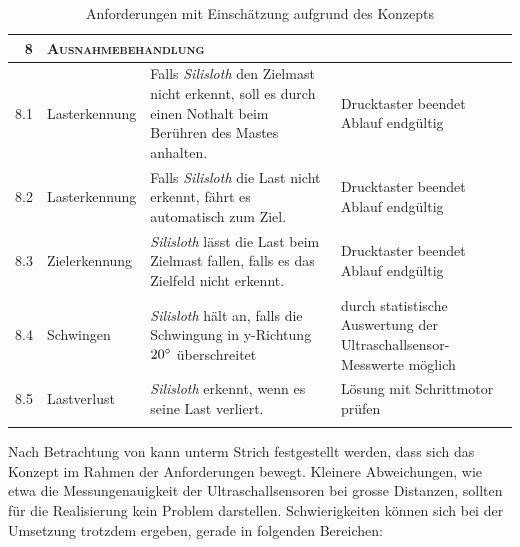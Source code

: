 {\begin{longtable}{|r|p{2cm}|p{5cm}|p{5.5cm}|}
    \hline
    \textsc{8} & \multicolumn{3}{l|}{\textsc{Ausnahmebehandlung}} \\
    \hline
    8.1 & Lasterkennung & Falls \textit{Silisloth} den Zielmast nicht erkennt, soll es durch einen Nothalt beim Berühren des Mastes anhalten. & Drucktaster beendet Ablauf endgültig \\
8.2 & Lasterkennung & Falls \textit{Silisloth} die Last nicht erkennt, fährt es automatisch zum Ziel. & Drucktaster beendet Ablauf endgültig \\
8.3 & Zielerkennung & \textit{Silisloth} lässt die Last beim Zielmast fallen, falls es das Zielfeld nicht erkennt. & Drucktaster beendet Ablauf endgültig \\
    8.4 & Schwingen & \textit{Silisloth} hält an, falls die Schwingung in y-Richtung $20\degree$ überschreitet & durch statistische Auswertung der Ul\-tra\-schallsensor-Messwerte möglich \\
8.5 & Lastverlust & \textit{Silisloth} erkennt, wenn es seine Last verliert. & Lösung mit Schrittmotor prüfen \\
\hline
\caption{Anforderungen mit Einschätzung aufgrund des Konzepts\label{tbl:review-anforderungen}}
\end{longtable}
}

Nach Betrachtung von  kann unterm Strich festgestellt werden, dass sich das Konzept im Rahmen der Anforderungen bewegt. Kleinere Abweichungen, wie etwa die Messungenauigkeit der Ultraschallsensoren bei grosse Distanzen, sollten für die Realisierung kein Problem darstellen. Schwierigkeiten können sich bei der Umsetzung trotzdem ergeben, gerade in folgenden Bereichen:

